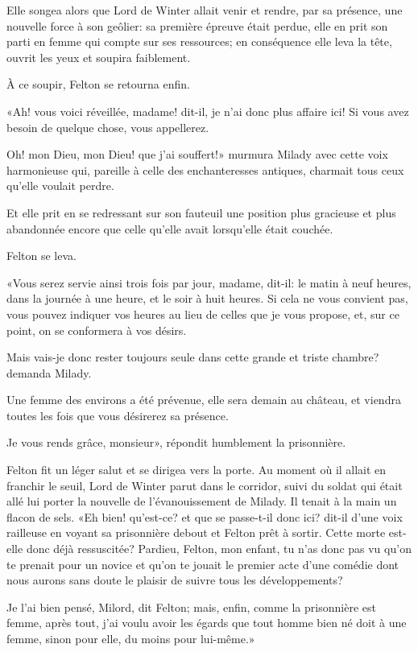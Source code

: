 Elle songea alors que Lord de Winter allait venir et rendre, par sa présence, une nouvelle force à son geôlier: sa première épreuve était perdue, elle en prit son parti en femme qui compte sur ses ressources; en conséquence elle leva la tête, ouvrit les yeux et soupira faiblement. 

À ce soupir, Felton se retourna enfin. 

«Ah! vous voici réveillée, madame! dit-il, je n'ai donc plus affaire ici! Si vous avez besoin de quelque chose, vous appellerez. 

\speak  Oh! mon Dieu, mon Dieu! que j'ai souffert!» murmura Milady avec cette voix harmonieuse qui, pareille à celle des enchanteresses antiques, charmait tous ceux qu'elle voulait perdre. 

Et elle prit en se redressant sur son fauteuil une position plus gracieuse et plus abandonnée encore que celle qu'elle avait lorsqu'elle était couchée. 

Felton se leva. 

«Vous serez servie ainsi trois fois par jour, madame, dit-il: le matin à neuf heures, dans la journée à une heure, et le soir à huit heures. Si cela ne vous convient pas, vous pouvez indiquer vos heures au lieu de celles que je vous propose, et, sur ce point, on se conformera à vos désirs. 

\speak  Mais vais-je donc rester toujours seule dans cette grande et triste chambre? demanda Milady. 

\speak  Une femme des environs a été prévenue, elle sera demain au château, et viendra toutes les fois que vous désirerez sa présence. 

\speak  Je vous rends grâce, monsieur», répondit humblement la prisonnière. 

Felton fit un léger salut et se dirigea vers la porte. Au moment où il allait en franchir le seuil, Lord de Winter parut dans le corridor, suivi du soldat qui était allé lui porter la nouvelle de l'évanouissement de Milady. Il tenait à la main un flacon de sels. «Eh bien! qu'est-ce? et que se passe-t-il donc ici? dit-il d'une voix railleuse en voyant sa prisonnière debout et Felton prêt à sortir. Cette morte est-elle donc déjà ressuscitée? Pardieu, Felton, mon enfant, tu n'as donc pas vu qu'on te prenait pour un novice et qu'on te jouait le premier acte d'une comédie dont nous aurons sans doute le plaisir de suivre tous les développements? 

\speak  Je l'ai bien pensé, Milord, dit Felton; mais, enfin, comme la prisonnière est femme, après tout, j'ai voulu avoir les égards que tout homme bien né doit à une femme, sinon pour elle, du moins pour lui-même.» 

